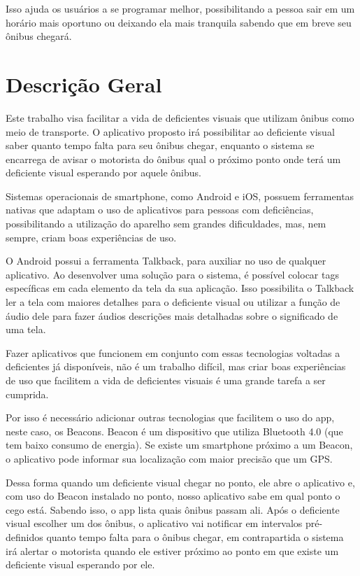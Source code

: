 \documentclass[
	12pt,				%
	oneside,			%
	a4paper,			%
	brazil				%
]{abntex2}
\begin{document}
Isso ajuda os usuários a se programar melhor, possibilitando a pessoa sair em um horário mais oportuno ou deixando ela mais tranquila sabendo que em breve seu ônibus chegará.

\section{Descrição Geral}

Este trabalho visa facilitar a vida de deficientes visuais que utilizam ônibus como meio de transporte. O aplicativo proposto irá possibilitar ao deficiente visual saber quanto tempo falta para seu ônibus chegar, enquanto o sistema se encarrega de avisar o motorista do ônibus qual o próximo ponto onde terá um deficiente visual esperando por aquele ônibus.

Sistemas operacionais de smartphone, como Android e iOS, possuem ferramentas nativas que adaptam o uso de aplicativos para pessoas com deficiências, possibilitando a utilização do aparelho sem grandes dificuldades, mas, nem sempre, criam boas experiências de uso. 

O Android possui a ferramenta Talkback, para auxiliar no uso de qualquer aplicativo. Ao desenvolver uma solução para o sistema, é possível colocar tags específicas em cada elemento da tela da sua aplicação. Isso possibilita o Talkback ler a tela com maiores detalhes para o deficiente visual ou utilizar a função de áudio dele para fazer áudios descrições mais detalhadas sobre o significado de uma tela.

Fazer aplicativos que funcionem em conjunto com essas tecnologias voltadas a deficientes já disponíveis, não é um trabalho difícil, mas criar boas experiências de uso que facilitem a vida de deficientes visuais é uma grande tarefa a ser cumprida.

Por isso é necessário adicionar outras tecnologias que facilitem o uso do app, neste caso, os Beacons. Beacon é um dispositivo que utiliza Bluetooth 4.0 (que tem baixo consumo de energia). Se existe um smartphone próximo a um Beacon, o aplicativo pode informar sua localização com maior precisão que um GPS.

Dessa forma quando um deficiente visual chegar no ponto, ele abre o aplicativo e, com uso do Beacon instalado no ponto, nosso aplicativo sabe em qual ponto o cego está. Sabendo isso, o app lista quais ônibus passam ali. Após o deficiente visual escolher um dos ônibus, o aplicativo vai notificar em intervalos pré-definidos quanto tempo falta para o ônibus chegar, em contrapartida o sistema irá alertar o motorista quando ele estiver próximo ao ponto em que existe um deficiente visual esperando por ele.
\end{document}

